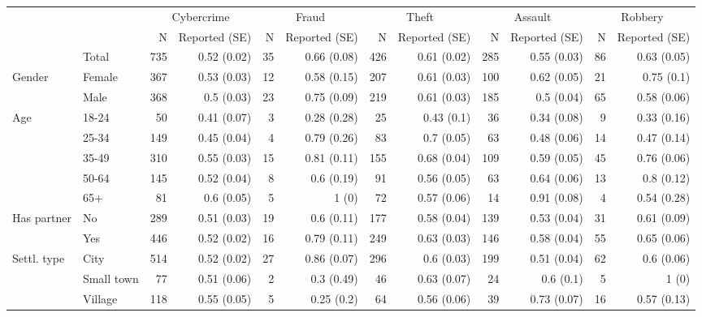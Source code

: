\begin{tabular}{llrrrrrrrrrr}
	\toprule
	&  & \multicolumn{2}{c}{Cybercrime    } & \multicolumn{2}{c}{Fraud    } & \multicolumn{2}{c}{Theft    } & \multicolumn{2}{c}{Assault    } & \multicolumn{2}{c}{Robbery    } \\ 
	\cmidrule(lr){3-4} \cmidrule(lr){5-6} \cmidrule(lr){7-8} \cmidrule(lr){9-10} \cmidrule(lr){11-12}
	&     & N & Reported (SE) & N  & Reported (SE)  & N   & Reported (SE)   & N    & Reported (SE)    & N     & Reported (SE)     \\ 
	\midrule\addlinespace[2.5pt]
	& Total & 735 & 0.52 (0.02) & 35 & 0.66 (0.08) & 426 & 0.61 (0.02) & 285 & 0.55 (0.03) & 86 & 0.63 (0.05) \\ 
	\midrule
	Gender & Female & 367 & 0.53 (0.03) & 12 & 0.58 (0.15) & 207 & 0.61 (0.03) & 100 & 0.62 (0.05) & 21 & 0.75 (0.1) \\ 
	& Male & 368 & 0.5 (0.03) & 23 & 0.75 (0.09) & 219 & 0.61 (0.03) & 185 & 0.5 (0.04) & 65 & 0.58 (0.06) \\ 
	\midrule
	Age & 18-24 & 50 & 0.41 (0.07) & 3 & 0.28 (0.28) & 25 & 0.43 (0.1) & 36 & 0.34 (0.08) & 9 & 0.33 (0.16) \\ 
	& 25-34 & 149 & 0.45 (0.04) & 4 & 0.79 (0.26) & 83 & 0.7 (0.05) & 63 & 0.48 (0.06) & 14 & 0.47 (0.14) \\ 
	& 35-49 & 310 & 0.55 (0.03) & 15 & 0.81 (0.11) & 155 & 0.68 (0.04) & 109 & 0.59 (0.05) & 45 & 0.76 (0.06) \\ 
	& 50-64 & 145 & 0.52 (0.04) & 8 & 0.6 (0.19) & 91 & 0.56 (0.05) & 63 & 0.64 (0.06) & 13 & 0.8 (0.12) \\ 
	& 65+ & 81 & 0.6 (0.05) & 5 & 1 (0) & 72 & 0.57 (0.06) & 14 & 0.91 (0.08) & 4 & 0.54 (0.28) \\
	\midrule
	Has partner & No & 289 & 0.51 (0.03) & 19 & 0.6 (0.11) & 177 & 0.58 (0.04) & 139 & 0.53 (0.04) & 31 & 0.61 (0.09) \\ 
	& Yes & 446 & 0.52 (0.02) & 16 & 0.79 (0.11) & 249 & 0.63 (0.03) & 146 & 0.58 (0.04) & 55 & 0.65 (0.06) \\
	\midrule
	Settl. type & City & 514 & 0.52 (0.02) & 27 & 0.86 (0.07) & 296 & 0.6 (0.03) & 199 & 0.51 (0.04) & 62 & 0.6 (0.06) \\ 
	& Small town & 77 & 0.51 (0.06) & 2 & 0.3 (0.49) & 46 & 0.63 (0.07) & 24 & 0.6 (0.1) & 5 & 1 (0) \\ 
	& Village & 118 & 0.55 (0.05) & 5 & 0.25 (0.2) & 64 & 0.56 (0.06) & 39 & 0.73 (0.07) & 16 & 0.57 (0.13) \\ 

\end{tabular}
